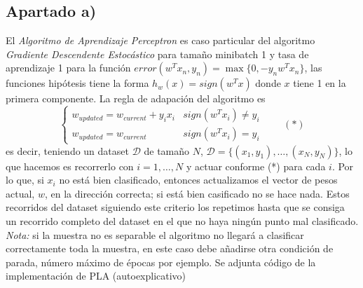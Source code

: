 \documentclass[11pt,a4paper]{article}
\theoremstyle{definition}
\begin{document}
    \subsection{Apartado a)}
    El \textit{Algoritmo de Aprendizaje Perceptron} es caso particular del algoritmo \textit{Gradiente Descendente Estocástico} para tamaño minibatch 1 y tasa de aprendizaje 1 para la función $error(w^T x_n, y_n)=\max \{0, -y_n w^T x_n\}$, las funciones hipótesis tiene la forma $h_w(x)=sign(w^Tx)$ donde $x$ tiene 1 en la primera componente.
    La regla de adapación del algoritmo es 
		$$\begin{cases}
		w_{updated} = w_{current} +y_ix_i & sign(w^Tx_i) \neq y_i\\
		w_{updated} = w_{current} & sign(w^Tx_i) = y_i
		\end{cases} \quad \quad (*)$$
		es decir, teniendo un dataset $\mathcal{D}$ de tamaño $N$, $\mathcal{D}=\{(x_1,y_1),\ldots,(x_N,y_N)\}$, lo que hacemos es recorrerlo con $i=1,\ldots, N$ y actuar conforme (*) para cada $i$. Por lo que, si $x_i$ no está bien clasificado, entonces actualizamos el vector de pesos actual, $w$, en la dirección correcta; si está bien casificado no se hace nada. Estos recorridos del dataset siguiendo este criterio los repetimos hasta que se consiga un recorrido completo del dataset en el que no haya ningún punto mal clasificado.\\
		\textit{Nota:} si la muestra no es separable el algoritmo no llegará a clasificar correctamente toda la muestra, en este caso debe añadirse otra condición de parada, número máximo de épocas por ejemplo.
		Se adjunta código de la implementación de PLA (autoexplicativo)
\end{document}

